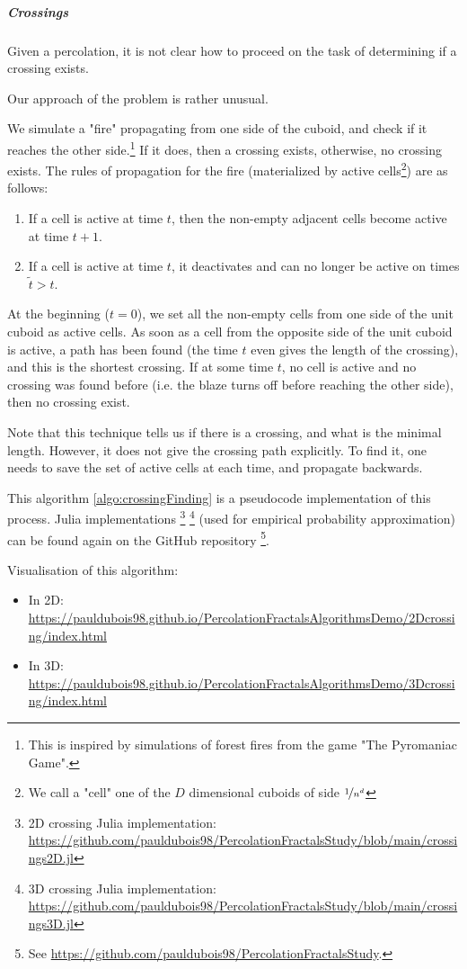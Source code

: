 \subparagraph{Crossings}\label{crossingAlgorithm}
Given a percolation, it is not clear how to proceed on the task of determining if a crossing exists.

Our approach of the problem is rather unusual.

We simulate a "fire" propagating from one side of the cuboid, and check if it reaches the other side.\footnote{This is inspired by simulations of forest fires from the game "The Pyromaniac Game"\cite{pyromaniacGame}.}
If it does, then a crossing exists, otherwise, no crossing exists.
The rules of propagation for the fire (materialized by active cells\footnote{We call a "cell" one of the $D$ dimensional cuboids of side $\nicefrac{1}{n^d}$}) are as follows:
\begin{enumerate}
	\item If a cell is active at time $t$, then the non-empty adjacent cells become active at time $t+1$.
	\item If a cell is active at time $t$, it deactivates and can no longer be active on times $\tilde{t}>t$.
\end{enumerate}
At the beginning ($t=0$), we set all the non-empty cells from one side of the unit cuboid as active cells.
As soon as a cell from the opposite side of the unit cuboid is active, a path has been found (the time $t$ even gives the length of the crossing), and this is the shortest crossing.
If at some time $t$, no cell is active and no crossing was found before (i.e. the blaze turns off before reaching the other side), then no crossing exist.

Note that this technique tells us if there is a crossing, and what is the minimal length. However, it does not give the crossing path explicitly.
To find it, one needs to save the set of active cells at each time, and propagate backwards.

This algorithm \ref{algo:crossingFinding} is a pseudocode implementation of this process.
Julia implementations
\footnote{2D crossing Julia implementation: \url{https://github.com/pauldubois98/PercolationFractalsStudy/blob/main/crossings2D.jl}}
\footnote{3D crossing Julia implementation: \url{https://github.com/pauldubois98/PercolationFractalsStudy/blob/main/crossings3D.jl}}
(used for empirical probability approximation) can be found again on the GitHub repository
\footnote{See \url{https://github.com/pauldubois98/PercolationFractalsStudy}.}.

Visualisation of this algorithm:
\begin{itemize}
	\item In 2D: \url{https://pauldubois98.github.io/PercolationFractalsAlgorithmsDemo/2Dcrossing/index.html}
	\item In 3D: \url{https://pauldubois98.github.io/PercolationFractalsAlgorithmsDemo/3Dcrossing/index.html}
\end{itemize}

